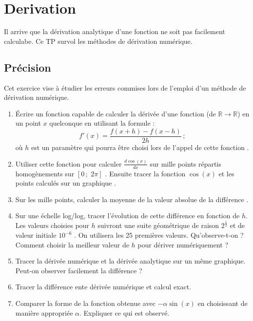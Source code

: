 \section{Derivation}
Il arrive que la dérivation analytique d'une fonction ne soit pas facilement
calculabe. Ce TP survol les méthodes de dérivation numérique.
\subsection{Précision}
Cet exercice vise à étudier les erreurs commises lors de l'emploi
d'un méthode de dérivation numérique.
\begin{enumerate}
\item Écrire un fonction capable de calculer la dérivée 
d'une fonction (de $\mathbb{R}  \longrightarrow  \mathbb{R}$)  en 
un point $x$ quelconque en utilisant la formule : 
$$f'(x)= \frac{f(x+h)-f(x-h)}{2h}\,;$$
où $h$ est un paramètre qui pourra être choisi lors de l'appel de cette fonction
.
\item Utiliser cette fonction pour calculer $\frac{d\cos(x)}{dx}$ 
sur mille points répartis homogènements sur $[0\,;\,\,2\pi]$
.
Ensuite tracer la fonction $\cos(x)$ et les points calculés sur
un graphique
.
\item Sur les mille points, calculer la moyenne de la valeur
 absolue de la différence
.
\item Sur une échelle log/log, tracer l'évolution de cette différence 
en fonction de $h$. Les valeurs choisies pour $h$ suivront une suite 
géométrique de raison $2^\frac{1}{2}$ et de valeur initiale $10^{-6}$ . 
On utilisera les 25 premières valeurs.
Qu'observe-t-on ? 
Comment choisir la meilleur valeur de $h$ pour dériver numériquement ? 
\item Tracer la dérivée numérique et la dérivée 
analytique sur un même graphique. Peut-on observer facilement la différence ? 
\item Tracer la différence ente dérivée numérique et calcul exact. 
\item Comparer la forme de la fonction obtenue avec 
$-\alpha \sin(x)$ en choisissant de manière appropriée $\alpha$.
Expliquer ce qui est observé. 
\end{enumerate}

